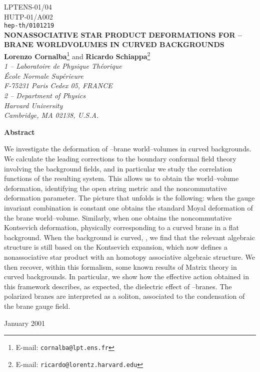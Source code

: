 \documentclass[a4paper,11pt]{article}
\providecommand{\vs}[1]{\vspace{#1 mm}}
\begin{document}
\begin{titlepage}
\begin{center}

\hfill  {LPTENS-01/04} \\
\hfill  {HUTP-01/A002} \\
\hfill  {\tt hep-th/0101219} \\
        [.3in]

{\large\bf
NONASSOCIATIVE STAR PRODUCT DEFORMATIONS FOR \coordHE{}--BRANE WORLDVOLUMES IN
CURVED BACKGROUNDS
}\\[.3in]

{\bf Lorenzo Cornalba}\footnote{E-mail: {\tt cornalba@lpt.ens.fr}}
\myHighlight{$\;$}\coordHE{} and \myHighlight{$\;$}\coordHE{}
{\bf Ricardo Schiappa}\footnote{E-mail: {\tt ricardo@lorentz.harvard.edu}}\\

\vs{4}
{\it 1 -- Laboratoire de Physique Th\'eorique}\\
{\it \'Ecole Normale Sup\'erieure}\\
{\it F-75231 Paris Cedex 05, FRANCE}\\
\vs{2}
{\it 2 -- Department of Physics}\\
{\it Harvard University}\\
{\it Cambridge, MA 02138, U.S.A.}\\

\end{center}

\vs{1}
\centerline{{\bf{Abstract}}}
\vs{1}

\small{
\noindent
We investigate the deformation of \coordHE{}--brane world--volumes in curved
backgrounds. We calculate the leading corrections to the boundary conformal
field theory involving the background fields, and in particular we study
the correlation functions of the resulting system. This allows us to obtain
the world--volume deformation, identifying the open string metric and the
noncommutative deformation parameter. The picture that unfolds is the
following: when the gauge invariant combination \coordHE{} is
constant one obtains the standard Moyal deformation of the brane
world--volume. Similarly, when \coordHE{} one obtains the noncommutative
Kontsevich deformation, physically corresponding to a curved brane in a
flat background.  When the background is curved, \coordHE{}, we
find that the relevant algebraic structure is still based on the Kontsevich
expansion, which now defines a nonassociative star product with an 
\coordHE{} homotopy associative algebraic structure. We then
recover, within this formalism, some known results of Matrix theory in
curved backgrounds. In particular, we show how the effective action
obtained in this framework describes, as expected, the dielectric effect of
\coordHE{}--branes. The polarized branes are interpreted as a soliton, associated
to the condensation of the brane gauge field.
}

\vs{2}

\noindent
\hfill January 2001

\end{titlepage}
\end{document}
